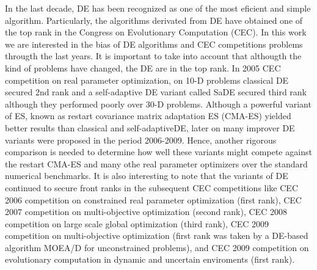 In the last decade, DE has been recognized as one of the most eficient and simple algorithm.
%
Particularly, the algorithms derivated from DE have obtained one of the top rank in the Congress on Evolutionary Computation (CEC).
%
In this work we are interested in the bias of DE algorithms and CEC competitions problems througth the last years.
%
It is important to take into account that althougth the kind of problems have changed, the DE are in the top rank.
%
In 2005 CEC competition on real parameter optimization, on 10-D problems classical DE secured 2nd rank and a self-adaptive DE variant called SaDE secured third rank although they performed poorly over 30-D problems.
%
Although a powerful variant of ES, known as restart covariance matrix adaptation ES (CMA-ES) yielded better results than classical and self-adaptiveDE, later on many improver DE variants were proposed in the period 2006-2009.
%
Hence, another rigorous comparison is needed to determine how well these variants might compete against the restart CMA-ES and many othe real parameter optimizers over the standard numerical benchmarks.
%
It is also interesting to note that the variants of DE continued to secure front ranks in the subsequent CEC competitions like CEC 2006 competition on constrained real parameter optimization (first rank), CEC 2007 competition on multi-objective optimization (second rank), CEC 2008 competition on large scale global optimization (third rank), CEC 2009 competition on multi-objective optimization (first rank was taken by a DE-based algorithm MOEA/D for unconstrained problems), and CEC 2009 competition on evolutionary computation in dynamic and uncertain enviroments (first rank).
%

